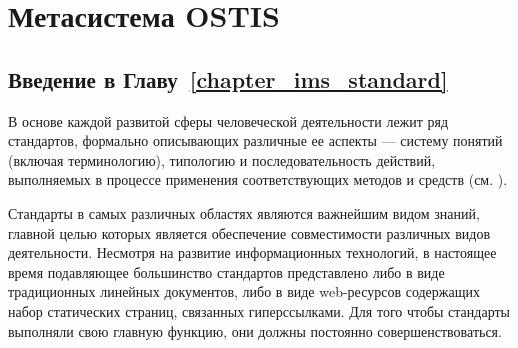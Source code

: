 \chapter{Метасистема OSTIS}
\label{chapter_ims_standard}

\vspace{-7\baselineskip}

\begin{SCn}
	
	
\end{SCn}

\section*{Введение в Главу~\ref{chapter_ims_standard}}

В основе каждой развитой сферы человеческой деятельности лежит ряд стандартов, формально описывающих различные ее аспекты --- систему понятий (включая терминологию), типологию и последовательность действий, выполняемых в процессе применения соответствующих методов и средств (см. ).

Стандарты в самых различных областях являются важнейшим видом знаний, главной целью которых является обеспечение совместимости различных видов деятельности.  Несмотря на развитие информационных технологий, в настоящее время подавляющее большинство стандартов представлено либо в виде традиционных линейных документов, либо в виде web-ресурсов содержащих набор статических страниц, связанных гиперссылками. Для того чтобы стандарты выполняли свою главную функцию, они должны постоянно совершенствоваться. 

